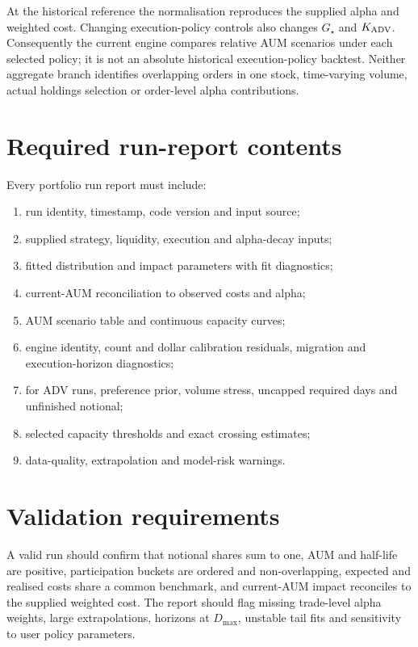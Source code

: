 \documentclass[11pt,a4paper]{article}
\numberwithin{equation}{section}
\begin{document}
At the historical reference the normalisation reproduces the supplied alpha and weighted cost.
Changing execution-policy controls also changes $G_\star$ and $K_{\rm ADV}$. Consequently the
current engine compares relative AUM scenarios under each selected policy; it is not an absolute
historical execution-policy backtest. Neither aggregate branch identifies overlapping orders in
one stock, time-varying volume, actual holdings selection or order-level alpha contributions.

\section{Required run-report contents}
Every portfolio run report must include:
\begin{enumerate}
  \item run identity, timestamp, code version and input source;
  \item supplied strategy, liquidity, execution and alpha-decay inputs;
  \item fitted distribution and impact parameters with fit diagnostics;
  \item current-AUM reconciliation to observed costs and alpha;
  \item AUM scenario table and continuous capacity curves;
  \item engine identity, count and dollar calibration residuals, migration and execution-horizon diagnostics;
  \item for ADV runs, preference prior, volume stress, uncapped required days and unfinished notional;
  \item selected capacity thresholds and exact crossing estimates;
  \item data-quality, extrapolation and model-risk warnings.
\end{enumerate}

\section{Validation requirements}
A valid run should confirm that notional shares sum to one, AUM and half-life are positive,
participation buckets are ordered and non-overlapping, expected and realised costs share a common
benchmark, and current-AUM impact reconciles to the supplied weighted cost. The report should flag
missing trade-level alpha weights, large extrapolations, horizons at $D_{\max}$, unstable tail fits
and sensitivity to user policy parameters.
\end{document}
